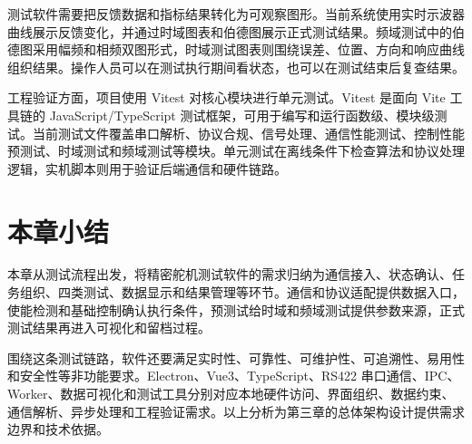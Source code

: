 测试软件需要把反馈数据和指标结果转化为可观察图形。当前系统使用实时示波器曲线展示反馈变化，并通过时域图表和伯德图展示正式测试结果。频域测试中的伯德图采用幅频和相频双图形式，时域测试图表则围绕误差、位置、方向和响应曲线组织结果。操作人员可以在测试执行期间看状态，也可以在测试结束后复查结果。

工程验证方面，项目使用 Vitest 对核心模块进行单元测试。Vitest 是面向 Vite 工具链的 JavaScript/TypeScript 测试框架，可用于编写和运行函数级、模块级测试。当前测试文件覆盖串口解析、协议合规、信号处理、通信性能测试、控制性能预测试、时域测试和频域测试等模块。单元测试在离线条件下检查算法和协议处理逻辑，实机脚本则用于验证后端通信和硬件链路。

\section{本章小结}

本章从测试流程出发，将精密舵机测试软件的需求归纳为通信接入、状态确认、任务组织、四类测试、数据显示和结果管理等环节。通信和协议适配提供数据入口，使能检测和基础控制确认执行条件，预测试给时域和频域测试提供参数来源，正式测试结果再进入可视化和留档过程。

围绕这条测试链路，软件还要满足实时性、可靠性、可维护性、可追溯性、易用性和安全性等非功能要求。Electron、Vue3、TypeScript、RS422 串口通信、IPC、Worker、数据可视化和测试工具分别对应本地硬件访问、界面组织、数据约束、通信解析、异步处理和工程验证需求。以上分析为第三章的总体架构设计提供需求边界和技术依据。
